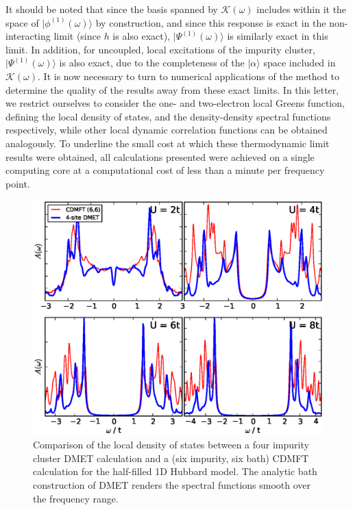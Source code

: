 \documentclass[aps,showpacs,twocolumn,nobibnotes]{revtex4}
\begin{document}
It should be noted that since the basis spanned by $\mathcal{K}(\omega)$ includes within it the space of $|\phi^{(1)}(\omega) \rangle$ by construction, 
and since this response is exact in the non-interacting limit (since $h$ is also exact), $|\Psi^{(1)}(\omega)\rangle$ is similarly exact in this limit.
In addition, for uncoupled, local excitations of the impurity cluster, $|\Psi^{(1)}(\omega)\rangle$ is also exact, due to the completeness of the 
$|\alpha \rangle$ space included in $\mathcal{K}(\omega)$. It is now necessary to turn to numerical applications of the method to determine the
quality of the results away from these exact limits. 
In this letter, we restrict ourselves to consider the one- and two-electron local Greens function,
defining the local density of states, and the density-density spectral functions respectively, while other local dynamic correlation functions can be obtained analogously.
To underline the small cost at which these thermodynamic limit results were obtained, all calculations presented were achieved on a single computing core at a 
computational cost of less than a minute per frequency point.

\begin{figure}
\begin{center}
    \vspace{-2mm}
\includegraphics[scale=0.475]{Plots/1D_Spectra/1D_Hub_Spectra.eps}
\end{center}
    \vspace{-8mm}
\caption{Comparison of the local density of states between a four impurity cluster DMET calculation and a
(six impurity, six bath) CDMFT calculation for the half-filled 1D Hubbard model. The analytic bath construction
of DMET renders the spectral functions smooth over the frequency range.}
\label{1D_DOS}
\end{figure}
\end{document}
